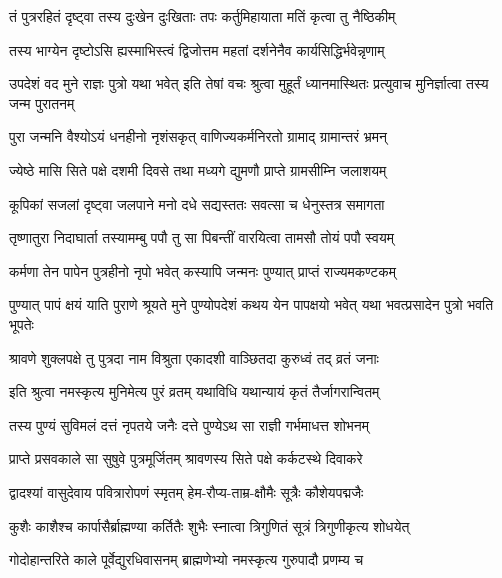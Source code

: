 \twolineshloka
{तं पुत्ररहितं दृष्ट्वा तस्य दुःखेन दुःखिताः}
{तपः कर्तुमिहायाता मतिं कृत्वा तु नैष्ठिकीम्}%

\twolineshloka
{तस्य भाग्येन दृष्टोऽसि ह्यस्माभिस्त्वं द्विजोत्तम}
{महतां दर्शनेनैव कार्यसिद्धिर्भवेन्नृणाम्}%

\threelineshloka
{उपदेशं वद मुने राज्ञः पुत्रो यथा भवेत्}
{इति तेषां वचः श्रुत्वा मुहूर्तं ध्यानमास्थितः}
{प्रत्युवाच मुनिर्ज्ञात्वा तस्य जन्म पुरातनम्}%


\twolineshloka
{पुरा जन्मनि वैश्योऽयं धनहीनो नृशंसकृत्}
{वाणिज्यकर्मनिरतो ग्रामाद् ग्रामान्तरं भ्रमन्}%

\twolineshloka
{ज्येष्ठे मासि सिते पक्षे दशमी दिवसे तथा}
{मध्यगे द्युमणौ प्राप्ते ग्रामसीम्नि जलाशयम्}%

\twolineshloka
{कूपिकां सजलां दृष्ट्वा जलपाने मनो दधे}
{सद्यस्ततः सवत्सा च धेनुस्तत्र समागता}%

\twolineshloka
{तृष्णातुरा निदाघार्ता तस्यामम्बु पपौ तु सा}
{पिबन्तीं वारयित्वा तामसौ तोयं पपौ स्वयम्}%

\twolineshloka
{कर्मणा तेन पापेन पुत्रहीनो नृपो भवेत्}
{कस्यापि जन्मनः पुण्यात् प्राप्तं राज्यमकण्टकम्}%


\threelineshloka
{पुण्यात् पापं क्षयं याति पुराणे श्रूयते मुने}
{पुण्योपदेशं कथय येन पापक्षयो भवेत्}
{यथा भवत्प्रसादेन पुत्रो भवति भूपतेः}%


\twolineshloka
{श्रावणे शुक्लपक्षे तु पुत्रदा नाम विश्रुता}
{एकादशी वाञ्छितदा कुरुध्वं तद् व्रतं जनाः}%

\twolineshloka
{इति श्रुत्वा नमस्कृत्य मुनिमेत्य पुरं व्रतम्}
{यथाविधि यथान्यायं कृतं तैर्जागरान्वितम्}%

\twolineshloka
{तस्य पुण्यं सुविमलं दत्तं नृपतये जनैः}
{दत्ते पुण्येऽथ सा राज्ञी गर्भमाधत्त शोभनम्}%

\twolineshloka
{प्राप्ते प्रसवकाले सा सुषुवे पुत्रमूर्जितम्}
{श्रावणस्य सिते पक्षे कर्कटस्थे दिवाकरे}%

\twolineshloka
{द्वादश्यां वासुदेवाय पवित्रारोपणं स्मृतम्}
{हेम-रौप्य-ताम्र-क्षौमैः सूत्रैः कौशेयपद्मजैः}%

\twolineshloka
{कुशैः काशैश्च कार्पासैर्ब्राह्मण्या कर्तितैः शुभैः}
{स्नात्वा त्रिगुणितं सूत्रं त्रिगुणीकृत्य शोधयेत्}%

\twolineshloka
{गोदोहान्तरिते काले पूर्वेद्युरधिवासनम्}
{ब्राह्मणेभ्यो नमस्कृत्य गुरुपादौ प्रणम्य च}%


